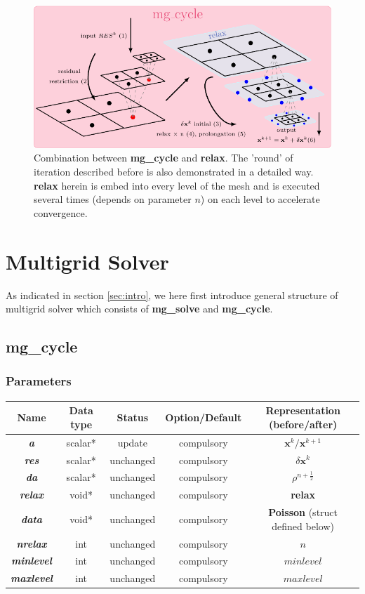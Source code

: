 \documentclass[a4paper]{article}
\newcommand{\func}[1]{\textbf{\textcolor{function}{#1}}}
\newcommand{\para}[1]{\textbf{\emph{\textcolor{para}{#1}}}}
\begin{document}
\begin{figure}[H]
    \centering
    \includegraphics[width=\textwidth]{image/mgcycle.pdf}
    \caption{Combination between \func{mg\_cycle} and \func{relax}. The 'round' of iteration described before is also demonstrated in a detailed way. \func{relax} herein is embed into every level of the mesh and is executed several times (depends on parameter $n$) on each level to accelerate convergence.}
    \label{fig:mgcycle}
\end{figure}

\section{Multigrid Solver}\label{sec:mgsolver}
As indicated in section \ref{sec:intro}, we here first introduce general structure of multigrid solver which consists of \func{mg\_solve} and \func{mg\_cycle}.
\subsection{\func{mg\_cycle}}
\subsubsection{Parameters}
\begin{center}
  \begin{tabular}{|c|c|c|c|c|}
    \hline
    Name & Data type & Status & Option/Default & Representation (before/after)\\[0.5ex]
    \hline\hline
    \rowcolor{output}\para{a} & scalar* & update & compulsory & $ \mathbf{x}^{k}/ \mathbf{x}^{k+1}$\\
    \hline
    \para{res} & scalar* & unchanged & compulsory & $ \delta \mathbf{x}^k$\\
    \hline
    \para{da} & scalar* & unchanged & compulsory & $\rho^{n+ \frac{1}{2}}$\\
    \hline
    \para{relax} & void* & unchanged & compulsory &  \func{relax}\\
    \hline
    \para{data} & void* & unchanged & compulsory &  \func{Poisson} (struct defined below)\\
    \hline
    \para{nrelax} & int & unchanged & compulsory & $n$ \\
    \hline
    \para{minlevel} & int & unchanged & compulsory & $minlevel$ \\
    \hline
    \para{maxlevel} & int & unchanged & compulsory & $maxlevel$ \\
    \hline
  \end{tabular}
\end{center}
\end{document}
